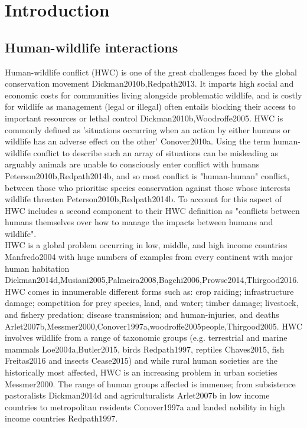 \section{Introduction}

\subsection{Human-wildlife interactions}

Human-wildlife conflict (HWC) is one of the great challenges faced by the global conservation movement {Dickman2010b,Redpath2013}. It imparts high social and economic costs for communities living alongside problematic wildlife, and is costly for wildlife as management (legal or illegal) often entails blocking their access to important resources or lethal control {Dickman2010b,Woodroffe2005}. HWC is commonly defined as 'situations occurring when an action by either humans or wildlife has an adverse effect on the other' {Conover2010a}. Using the term human-wildlife conflict to describe such an array of situations can be misleading as arguably animals are unable to consciously enter conflict with humans {Peterson2010b,Redpath2014b}, and so most conflict is "human-human" conflict, between those who prioritise species conservation against those whose interests wildlife threaten {Peterson2010b,Redpath2014b}. To account for this aspect of HWC \citet{Kansky2016} includes a second component to their HWC definition as "conflicts between humans themselves over how to manage the impacts between humans and wildlife".\\

HWC is a global problem occurring in low, middle, and high income countries {Manfredo2004} with huge numbers of examples from every continent with major human habitation {Dickman2014d,Musiani2005,Palmeira2008,Bagchi2006,Prowse2014,Thirgood2016}. HWC comes in innumerable different forms such as: crop raiding; infrastructure damage; competition for prey species, land, and water; timber damage; livestock, and fishery predation; disease transmission; and human-injuries, and deaths {Arlet2007b,Messmer2000,Conover1997a,woodroffe2005people,Thirgood2005}. HWC involves wildlife from a range of taxonomic groups (e.g. terrestrial and marine mammals {Loe2004a,Butler2015}, birds {Redpath1997}, reptiles {Chaves2015}, fish {Freitas2016} and insects {Cease2015}) and while rural human societies are the historically most affected, HWC is an increasing problem in urban societies {Messmer2000}. The range of human groups affected is immense; from subsistence pastoralists {Dickman2014d} and agriculturalists {Arlet2007b} in low income countries to metropolitan residents {Conover1997a} and landed nobility in high income countries {Redpath1997}.\\

